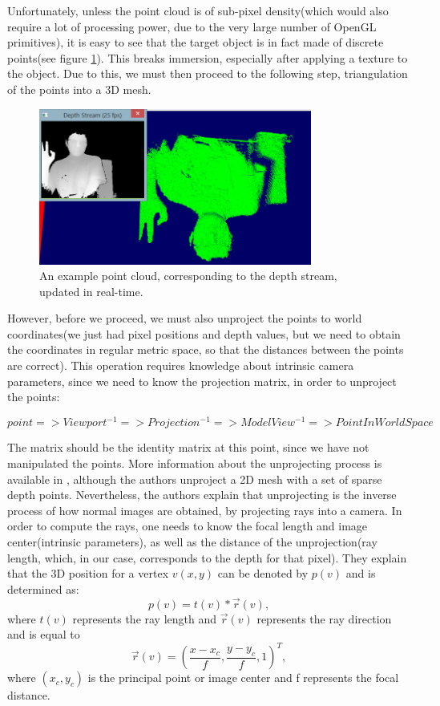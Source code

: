 \documentclass[]{article}
\begin{document}
Unfortunately, unless the point cloud is of sub-pixel density(which would also require a lot of processing power, due to the very large number of OpenGL primitives), it is easy to see that the target object is in fact made of discrete points(see figure \ref{fig:PointCloud}). This breaks immersion, especially after applying a texture to the object. Due to this, we must then proceed to the following step, triangulation of the points into a 3D mesh.

\begin{figure}[hbtp]
    \centering
    \includegraphics[width=0.8\textwidth]{figures/PointCloud.PNG}
    \caption{An example point cloud, corresponding to the depth stream, updated in real-time.}
    \label{fig:PointCloud}
\end{figure}

 However, before we proceed, we must also unproject the points to world coordinates(we just had pixel positions and depth values, but we need to obtain the coordinates in regular metric space, so that the distances between the points are correct). This operation requires knowledge about intrinsic camera parameters, since we need to know the projection matrix, in order to unproject the points:

$$point => Viewport^{-1} => Projection^{-1} => ModelView^{-1} => PointInWorldSpace$$

The  matrix should be the identity matrix at this point, since we have not manipulated the points.
More information about the unprojecting process is available in \cite{sung2013}, although the authors unproject a 2D mesh with a set of sparse depth points. Nevertheless, the authors explain that unprojecting is the inverse process of how normal images are obtained, by projecting rays into a camera. In order to compute the rays, one needs to know the focal length and image center(intrinsic parameters), as well as the distance of the unprojection(ray length, which, in our case, corresponds to the depth for that pixel). They explain that the 3D position for a vertex $v(x,y)$ can be denoted by $p(v)$ and is determined as:
$$p(v) = t(v) *\vec{r}(v),$$
where $t(v)$ represents the ray length and $\vec{r}(v)$ represents the ray direction and is equal to $$\vec{r}(v) = (\frac{x - x_{c}}{f},\frac{y-y_{c}}{f},1)^T,$$ where $(x_{c}, y_{c})$ is the principal point or image center and f represents the focal distance.
\end{document}
